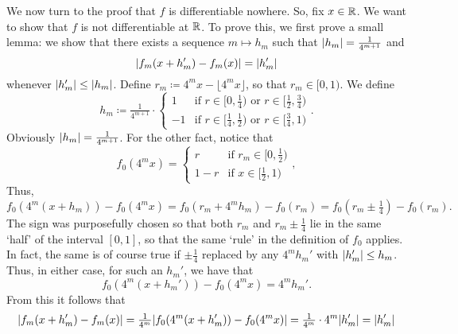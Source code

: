 \begin{exm}
\begin{savenotes}
We now turn to the proof that $f$ is differentiable nowhere.  So, fix $x\in \mathbb{R}$.  We want to show that $f$ is not differentiable at $\mathbb{R}$.  To prove this, we first prove a small lemma:  we show that there exists a sequence $m\mapsto h_m$ such that $\lvert h_m\rvert=\frac{1}{4^{m+1}}$ and
\begin{equation}
\lvert f_m(x+h_m')-f_m(x)\rvert=\lvert h_m'\rvert
\end{equation}
whenever $\lvert h_m'\rvert\leq \lvert h_m\rvert$.  Define $r_m\coloneqq 4^mx-\lfloor 4^mx\rfloor$, so that $r_m\in [0,1)$.  We define
\begin{equation}
h_m\coloneqq \tfrac{1}{4^{m+1}}\cdot \begin{cases}1 & \text{if }r\in [0,\tfrac{1}{4})\text{ or }r\in [\tfrac{1}{2},\tfrac{3}{4}) \\ -1 & \text{if }r\in [\tfrac{1}{4},\tfrac{1}{2})\text{ or }r\in [\tfrac{3}{4},1)\end{cases}.
\end{equation}
Obviously $\lvert h_m\rvert=\frac{1}{4^{m+1}}$.  For the other fact, notice that
\begin{equation}
f_0(4^mx)=\begin{cases}r & \text{if }r_m\in [0,\tfrac{1}{2}) \\ 1-r & \text{if }x\in [\tfrac{1}{2},1)\end{cases},
\end{equation}
Thus,
\begin{equation}
f_0(4^m(x+h_m))-f_0(4^mx)=f_0(r_m+4^mh_m)-f_0(r_m)=f_0(r_m\pm \tfrac{1}{4})-f_0(r_m).
\end{equation}
The sign was purposefully chosen so that both $r_m$ and $r_m\pm \frac{1}{4}$ lie in the same `half' of the interval $[0,1]$, so that the same `rule' in the definition of $f_0$ applies.  In fact, the same is of course true if $\pm \tfrac{1}{4}$ replaced by any $4^mh_m'$ with $\lvert h_m'\rvert\leq h_m$.  Thus, in either case, for such an $h_m'$, we have that
\begin{equation}
f_0(4^m(x+h_m'))-f_0(4^mx)=4^mh_m'.
\end{equation}
From this it follows that
\begin{equation}
\lvert f_m(x+h_m')-f_m(x)\rvert=\tfrac{1}{4^m}\lvert f_0(4^m(x+h_m'))-f_0(4^mx)\rvert=\tfrac{1}{4^m}\cdot 4^m\lvert h_m'\rvert=\lvert h_m'\rvert
\end{equation}


\end{savenotes}
\end{exm}
